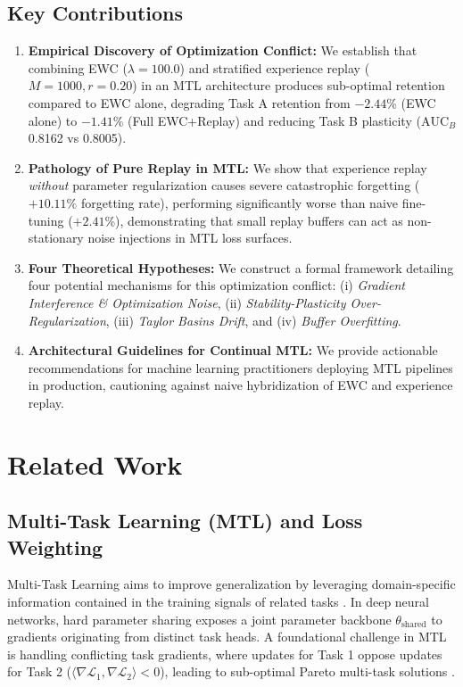 \documentclass{article}
\begin{document}
\subsection{Key Contributions}
\begin{enumerate}
    \item \textbf{Empirical Discovery of Optimization Conflict:} We establish that combining EWC ($\lambda=100.0$) and stratified experience replay ($M=1000, r=0.20$) in an MTL architecture produces sub-optimal retention compared to EWC alone, degrading Task A retention from $-2.44\%$ (EWC alone) to $-1.41\%$ (Full EWC+Replay) and reducing Task B plasticity ($\text{AUC}_B$ 0.8162 vs 0.8005).
    \item \textbf{Pathology of Pure Replay in MTL:} We show that experience replay \emph{without} parameter regularization causes severe catastrophic forgetting ($+10.11\%$ forgetting rate), performing significantly worse than naive fine-tuning ($+2.41\%$), demonstrating that small replay buffers can act as non-stationary noise injections in MTL loss surfaces.
    \item \textbf{Four Theoretical Hypotheses:} We construct a formal framework detailing four potential mechanisms for this optimization conflict: (i) \emph{Gradient Interference \& Optimization Noise}, (ii) \emph{Stability-Plasticity Over-Regularization}, (iii) \emph{Taylor Basins Drift}, and (iv) \emph{Buffer Overfitting}.
    \item \textbf{Architectural Guidelines for Continual MTL:} We provide actionable recommendations for machine learning practitioners deploying MTL pipelines in production, cautioning against naive hybridization of EWC and experience replay.
\end{enumerate}

\section{Related Work}

\subsection{Multi-Task Learning (MTL) and Loss Weighting}
Multi-Task Learning aims to improve generalization by leveraging domain-specific information contained in the training signals of related tasks \cite{caruana1997multitask, ruder2017overview}. In deep neural networks, hard parameter sharing exposes a joint parameter backbone $\theta_{\text{shared}}$ to gradients originating from distinct task heads. A foundational challenge in MTL is handling conflicting task gradients, where updates for Task 1 oppose updates for Task 2 ($\langle \nabla \mathcal{L}_1, \nabla \mathcal{L}_2 \rangle < 0$), leading to sub-optimal Pareto multi-task solutions \cite{yu2020gradient, sener2018multi}.
\end{document}
